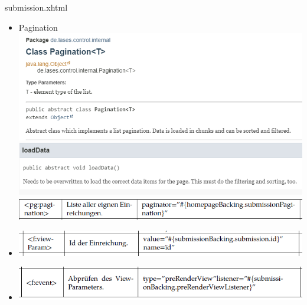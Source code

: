 \documentclass{beamer}
\begin{document}
\begin{frame}{submission.xhtml}
\begin{itemize}
            \item Pagination
            \centering
            \includegraphics[height=1.1\textheight]{graphics/facelet/pagination/doc_pag}
            \centering
            \includegraphics[height=1.1\textheight]{graphics/facelet/pagination/doc_loaddata}
            \centering
            \includegraphics[height=1.1\textheight]{graphics/facelet/pagination/fac_pag}

            \item <f:viewParam>
            \centering
            \includegraphics[height=1.1\textheight]{graphics/facelet/fac_viewParam}

            \item <f:event>
            \centering
            \includegraphics[height=1.1\textheight]{graphics/facelet/fac_event}


\end{itemize}
\end{frame}
\end{document}
